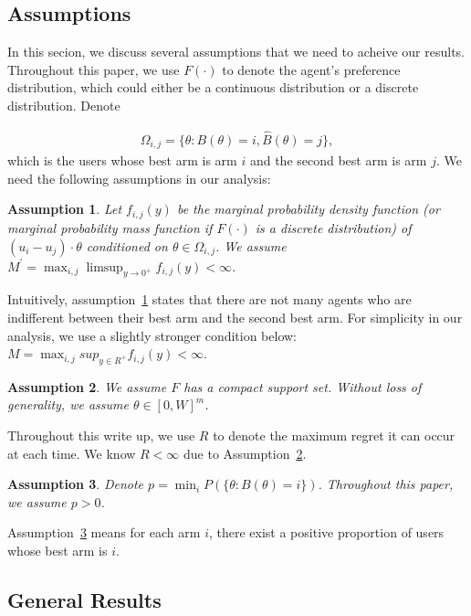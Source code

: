 \documentclass{article}
\newtheorem{assumption}{Assumption}
\begin{document}
\subsection{Assumptions}
In this secion, we discuss several assumptions that we need to acheive our results. Throughout this paper, we use $F(\cdot)$ to denote the agent's preference distribution, which could either be a continuous distribution or a discrete distribution. Denote

\begin{align}
\Omega_{i,j}=\{\theta:B(\theta)=i, \hat{B}(\theta)=j\}, \nonumber 
\end{align}
which is the users whose best arm is arm $i$ and the second best arm is arm $j$. We need the following assumptions in our analysis:

\begin{assumption} Let $f_{i,j}(y)$ be the marginal probability density function (or marginal probability mass function if $F(\cdot)$ is a discrete distribution) of $(u_i-u_j)\cdot\theta$ conditioned on $\theta \in \Omega_{i,j}$. We assume $M^{'}=\max_{i,j}\limsup_{y\rightarrow 0^{+}}f_{i,j}(y) <\infty$.
\label{A1}
\end{assumption}

Intuitively, assumption~\ref{A1} states that there are not many agents who are indifferent between their best arm and the second best arm. For simplicity in our analysis, we use a slightly stronger condition below: $M=\max_{i,j}sup_{y\in R^{+}}f_{i,j}(y) <\infty$.


\begin{assumption} We assume $F$ has a compact support set. Without loss of generality, we assume $\theta\in [0,W]^m$.
\label{A2}
\end{assumption}

Throughout this write up, we use $R$ to denote the maximum regret it can occur at each time. We know $R<\infty$ due to Assumption~\ref{A2}. 

\begin{assumption}
Denote $p=\min_{i}P(\{\theta: B(\theta)=i\})$. Throughout this paper, we assume $p>0$.
\label{A3}
\end{assumption}

Assumption~\ref{A3} means for each arm $i$, there exist a positive proportion of users whose best arm is $i$. 



\subsection{General Results}
\end{document}

